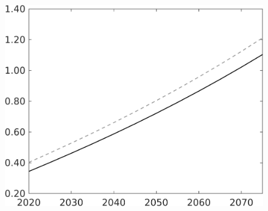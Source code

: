\begin{figure}[h!!]
\begin{minipage}[]{0.32\textwidth}
	\end{minipage}		
	\begin{minipage}[]{0.32\textwidth}
		\includegraphics[width=1\textwidth]{../../codding_model/own_basedOnFried/optimalPol_010922_revision/figures/all_13Sept22/CompTaul_LFBAU_Reg0_C_spillover0_nsk0_xgr0_sep1_countec0_GovRev1_etaa0.79_lgd0.png}
	\end{minipage}	
\end{figure}


